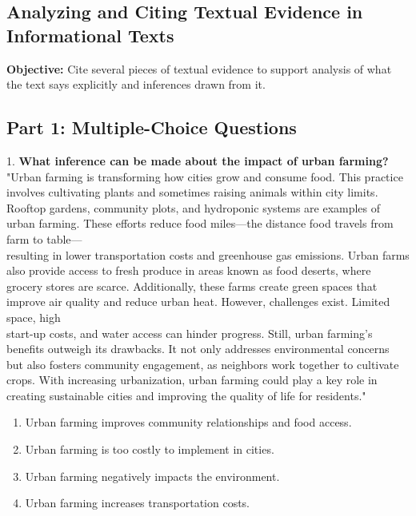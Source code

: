 \documentclass[12pt]{article}
\begin{document}
\subsection*{Analyzing and Citing Textual Evidence in Informational Texts}
\onehalfspacing

\begin{tcolorbox}[colframe=black!40, colback=gray!0, title=Learning Objective]
\textbf{Objective:} Cite several pieces of textual evidence to support analysis of what the text says explicitly and inferences drawn from it.
\end{tcolorbox}

\subsection*{Part 1: Multiple-Choice Questions}

1. \textbf{What inference can be made about the impact of urban farming?\\}
"Urban farming is transforming how cities grow and consume food. This practice involves cultivating plants and sometimes raising animals within city limits. Rooftop gardens, community plots, and hydroponic systems are examples of urban farming. These efforts reduce food miles—the distance food travels from farm to table—\\ resulting in lower transportation costs and greenhouse gas emissions. Urban farms also provide access to fresh produce in areas known as food deserts, where grocery stores are scarce. Additionally, these farms create green spaces that improve air quality and reduce urban heat. However, challenges exist. Limited space, high \\start-up costs, and water access can hinder progress. Still, urban farming’s benefits outweigh its drawbacks. It not only addresses environmental concerns but also fosters community engagement, as neighbors work together to cultivate crops. With increasing urbanization, urban farming could play a key role in creating sustainable cities and improving the quality of life for residents."  
\begin{enumerate}[label=\Alph*.]
    \item Urban farming improves community relationships and food access.  
    \item Urban farming is too costly to implement in cities.  
    \item Urban farming negatively impacts the environment.  
    \item Urban farming increases transportation costs.  
\end{enumerate}
\end{document}
